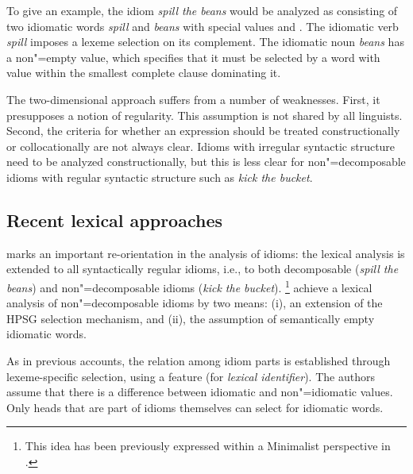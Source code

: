 \documentclass[output=paper
	        ,collection
	        ,collectionchapter
 	        ,biblatex
                ,babelshorthands
                ,newtxmath
                ,draftmode
                ,colorlinks, citecolor=brown
]{langscibook}
\begin{document}
To give an example, the idiom \emph{spill the beans} would be analyzed as consisting of two  idiomatic words \emph{spill} and \emph{beans} with special  values  and . The idiomatic verb \emph{spill} imposes a lexeme selection on its complement. The idiomatic noun \emph{beans} has a non"=empty  value, which specifies that it must be selected by a word with  value  within the smallest complete clause dominating it.


The two-dimensional approach suffers from a number of weaknesses. 
First, it presupposes a notion of regularity. This assumption is not shared by all linguists.
Second, the criteria for whether an expression should be treated constructionally or collocationally are not always clear. 
Idioms with irregular syntactic structure need to be analyzed constructionally, but this is less clear for non"=decomposable idioms with regular syntactic structure such as \emph{kick the bucket}.



\subsection{Recent lexical approaches}
\label{Sec-RecentLexical}

\citet{KSF2015a} marks an important re-orientation in the analysis of idioms: the lexical analysis is extended to all syntactically regular idioms, i.e., to both decomposable (\emph{spill the beans}) and non"=decomposable idioms (\emph{kick the bucket}).%
\footnote{This idea has been previously expressed within a  Minimalist perspective in \citet{Everaert:10}. 
}
%
\citet{KSF2015a} achieve a lexical analysis of non"=decomposable idioms by two means: (i), an extension of the HPSG selection mechanism, and (ii), the assumption of semantically empty idiomatic words. 

As in previous accounts, the relation among idiom parts is established through lexeme-specific selection, using a feature  (for \emph{lexical identifier}). 
The authors assume that there is a difference between idiomatic and non"=idiomatic  values. 
Only heads that are part of idioms themselves can select for idiomatic words. 
\end{document}
